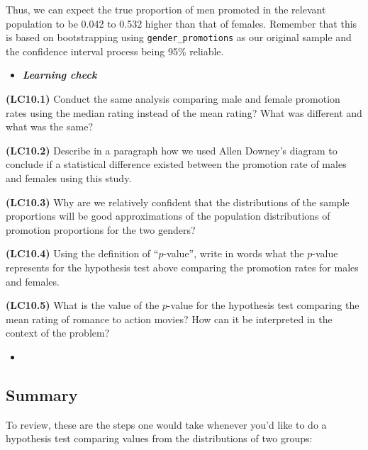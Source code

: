 \documentclass[12pt, krantz2,]{krantz}
\newenvironment{rmdblock}[1]
  {\begin{shaded*}
  \begin{itemize}
  \renewcommand{\labelitemi}{
    \raisebox{-.7\height}[0pt][0pt]{
    }
  }
  \item
  }
  {
  \end{itemize}
  \end{shaded*}
  }
\newenvironment{learncheck}
  {\begin{rmdblock}{warning}}
  {\end{rmdblock}}
\begin{document}
Thus, we can expect the true proportion of men promoted in the relevant population to be 0.042 to 0.532 higher than that of females. Remember that this is based on bootstrapping using \texttt{gender\_promotions} as our original sample and the confidence interval process being 95\% reliable.

\begin{learncheck}
\textbf{\emph{Learning check}}
\end{learncheck}

\textbf{(LC10.1)} Conduct the same analysis comparing male and female promotion rates using the median rating instead of the mean rating? What was different and what was the same?

\textbf{(LC10.2)} Describe in a paragraph how we used Allen Downey's diagram to conclude if a statistical difference existed between the promotion rate of males and females using this study.

\textbf{(LC10.3)} Why are we relatively confident that the distributions of the sample proportions will be good approximations of the population distributions of promotion proportions for the two genders?

\textbf{(LC10.4)} Using the definition of ``\(p\)-value'', write in words what the \(p\)-value represents for the hypothesis test above comparing the promotion rates for males and females.

\textbf{(LC10.5)} What is the value of the \(p\)-value for the hypothesis test comparing the mean rating of romance to action movies? How can it be interpreted in the context of the problem?

\begin{learncheck}

\end{learncheck}

\hypertarget{summary-5}{%
\subsection{Summary}\label{summary-5}}

To review, these are the steps one would take whenever you'd like to do a hypothesis test comparing
values from the distributions of two groups:
\end{document}
